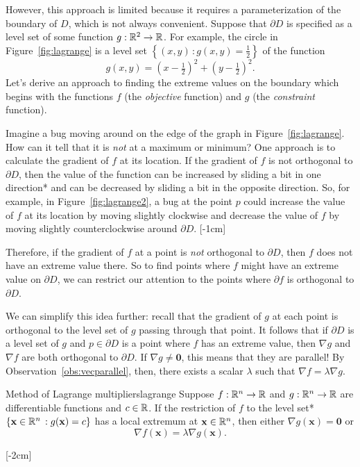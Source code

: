 \documentclass[prettycode,shellescape]{watsonbook}
\begin{document}
However, this approach is limited because it requires a
parameterization of the boundary of $D$, which is not always
convenient. Suppose that $\partial D$ is specified as a level set of
some function $g: \mathbb{R}^2 \to \mathbb{R}$. For example, the
circle in Figure~\ref{fig:lagrange} is a level set $\left\{(x,y) \, :
  g(x,y) = \tfrac{1}{2}\right\}$ of the function
\[
  g(x,y) = \left(x-\tfrac{1}{2}\right)^2 + \left(y-\tfrac{1}{2}\right)^2. 
\]
Let's derive an approach to finding the extreme values on the
boundary which begins with the functions $f$ (the \textit{objective}
function) and $g$ (the \textit{constraint} function).


Imagine a bug moving around on the edge of the graph in
Figure~\ref{fig:lagrange}. How can it tell that it is \textit{not} at
a maximum or minimum? One approach is to calculate the gradient of $f$
at its location. If the gradient of $f$ is not orthogonal to
$\partial D$, then the value of the function can be increased by
sliding a bit in one direction* and can be decreased by sliding a bit
in the opposite direction. So, for example, in
Figure~\ref{fig:lagrange2}, a bug at the point $p$ could increase the
value of $f$ at its location by moving slightly clockwise and decrease
the value of $f$ by moving slightly counterclockwise around
$\partial D$. [-1cm]

Therefore, if the gradient of $f$ at a point is \textit{not}
orthogonal to $\partial D$, then $f$ does not have an extreme value
there. So to find points where $f$ might have an extreme value on
$\partial D$, we can restrict our attention to the points where
$\partial f$ is orthogonal to $\partial D$.

We can simplify this idea further: recall that the gradient of $g$ at
each point is orthogonal to the level set of $g$ passing through that
point. It follows that if $\partial D$ is a level set of $g$ and
$p \in \partial D$ is a point where $f$ has an extreme value, then
$\nabla g$ and $\nabla f$ are both orthogonal to $\partial D$. If
$\nabla g \neq \mathbf{0}$, this means that they are parallel! By
Observation~\ref{obs:vecparallel}, then, there exists a scalar
$\lambda$ such that $\nabla f = \lambda \nabla g$.

\begin{theo}{Method of Lagrange multipliers}{lagrange}
  Suppose $f: \mathbb{R}^n \to \mathbb{R}$ and $g:\mathbb{R}^n \to \mathbb{R}$ are differentiable
  functions and $c \in \mathbb{R}$. If the restriction of $f$ to the level
  set* $\{\mathbf{x} \in \mathbb{R}^n \,: g(\mathbf{x}) = c\}$ has a local
  extremum at $\mathbf{x} \in \mathbb{R}^n$, then either $\nabla g(\mathbf{x}) =
  \mathbf{0}$ or 
  \[
    \nabla f (\mathbf{x}) = \lambda \nabla g (\mathbf{x}). 
  \]
\end{theo} [-2cm]
\end{document}
